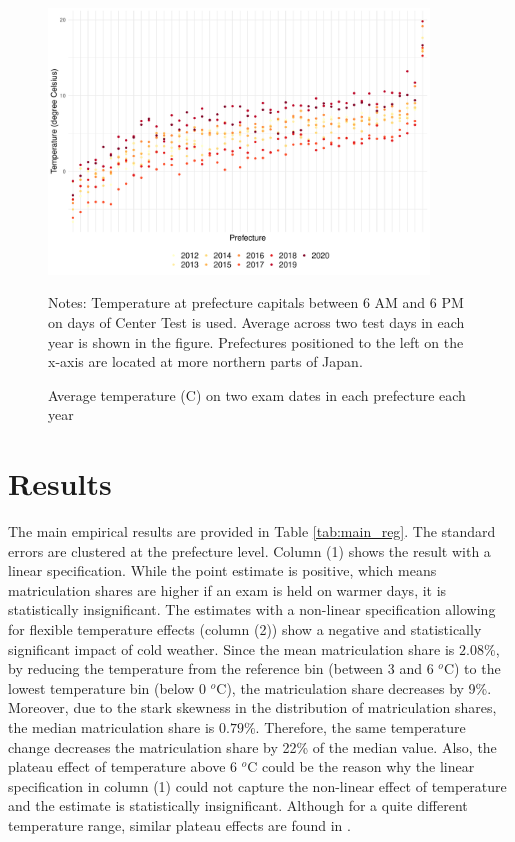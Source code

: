 \documentclass[12pt,letterpaper]{article}
\begin{document}
\begin{figure}[H]
  \centering
  \caption{Average temperature (\degree C) on two exam dates in each prefecture each year}
  \includegraphics[width = 0.9\textwidth]{../Output/images/temperature_diff.pdf}
  \label{fig:temperature_diff}
  \footnotesize
  \begin{tablenotes}
    \item Notes:
      Temperature at prefecture capitals between 6 AM and 6 PM on days of Center Test is used.
      Average across two test days in each year is shown in the figure.
      Prefectures positioned to the left on the x-axis are located at more northern parts of Japan.
  \end{tablenotes}
\end{figure}

\section{Results}\label{sec:results}

The main empirical results are provided in Table \ref{tab:main_reg}.
The standard errors are clustered at the prefecture level.
Column (1) shows the result with a linear specification.
While the point estimate is positive, which means matriculation shares are higher if an exam is held on warmer days, it is statistically insignificant. 
The estimates with a non-linear specification allowing for flexible temperature effects (column (2)) show a negative and statistically significant impact of cold weather. 
Since the mean matriculation share is $2.08$\%, by reducing the temperature from the reference bin (between 3 and 6 $^o$C) to the lowest temperature bin (below 0 $^o$C), the matriculation share decreases by 9\%.
Moreover, due to the stark skewness in the distribution of matriculation shares, the median matriculation share is $0.79$\%.
Therefore, the same temperature change decreases the matriculation share by 22\% of the median value.
Also, the plateau effect of temperature above 6 $^o$C could be the reason why the linear specification in column (1) could not capture the non-linear effect of temperature and the estimate is statistically insignificant.
Although for a quite different temperature range, similar plateau effects are found in \citet{Park2020a}.
\end{document}
